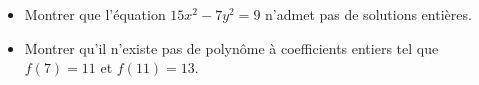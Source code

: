 \begin{itemize}
  \item Montrer que l'équation $15x^2 - 7y^2 = 9$ n'admet pas de solutions
  entières.
  \item Montrer qu'il n'existe pas de polynôme à coefficients entiers tel que
  $f(7) = 11$ et $f(11) = 13$.
\end{itemize}
